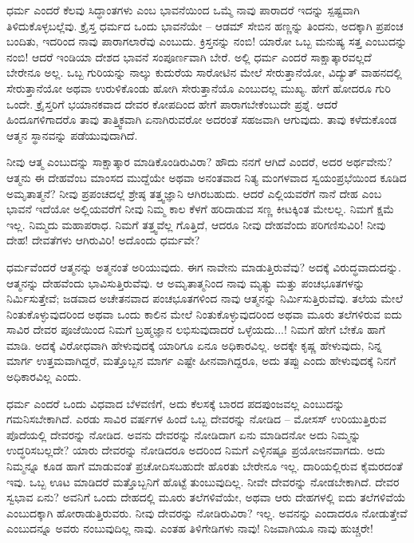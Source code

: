 ಧರ್ಮ ಎಂದರೆ ಕೆಲವು ಸಿದ್ಧಾಂತಗಳು ಎಂಬ ಭಾವನೆಯಿಂದ ಒಮ್ಮೆ ನಾವು ಪಾರಾದರೆ ಇದನ್ನು ಸ್ಪಷ್ಟವಾಗಿ ತಿಳಿದುಕೊಳ್ಳಬಲ್ಲೆವು. ಕ್ರೈಸ್ತ ಧರ್ಮದ ಒಂದು ಭಾವನೆಯೇ – ಆಡಮ್​ ಸೇಬಿನ ಹಣ್ಣನ್ನು ತಿಂದನು, ಅದಕ್ಕಾಗಿ ಪ್ರಪಂಚ ಬಂದಿತು, ಇದರಿಂದ ನಾವು ಪಾರಾಗಲಾರೆವು ಎಂಬುದು. ಕ್ರಿಸ್ತನನ್ನು ನಂಬಿ! ಯಾರೋ ಒಬ್ಬ ಮನುಷ್ಯ ಸತ್ತ ಎಂಬುದನ್ನು ನಂಬಿ! ಆದರೆ ಇಂಡಿಯಾ ದೇಶದ ಭಾವನೆ ಸಂಪೂರ್ಣವಾಗಿ ಬೇರೆ. ಅಲ್ಲಿ ಧರ್ಮ ಎಂದರೆ ಸಾಕ್ಷಾತ್ಕಾರವಲ್ಲದೆ ಬೇರೇನೂ ಅಲ್ಲ. ಒಬ್ಬ ಗುರಿಯನ್ನು ನಾಲ್ಕು ಕುದುರೆಯ ಸಾರೋಟಿನ ಮೇಲೆ ಸೇರುತ್ತಾನೆಯೋ, ವಿದ್ಯುತ್​ ವಾಹನದಲ್ಲಿ ಸೇರುತ್ತಾನೆಯೋ ಅಥವಾ ಉರುಳಿಕೊಂಡು ಹೋಗಿ ಸೇರುತ್ತಾನೆಯೊ ಎಂಬುದಲ್ಲ ಮುಖ್ಯ. ಹೇಗೆ ಹೋದರೂ ಗುರಿ ಒಂದೇ. ಕ್ರೈಸ್ತರಿಗೆ ಭಯಾನಕವಾದ ದೇವರ ಕೋಪದಿಂದ ಹೇಗೆ ಪಾರಾಗಬೇಕೆಂಬುದೇ ಪ್ರಶ್ನೆ. ಆದರೆ ಹಿಂದೂಗಳಿಗಾದರೊ ತಾವು ತಾತ್ತ್ವಿಕವಾಗಿ ಏನಾಗಿರುವರೋ ಅದರಂತೆ ಸಹಜವಾಗಿ ಆಗುವುದು. ತಾವು ಕಳೆದುಕೊಂಡ ಆತ್ಮನ ಸ್ಥಾನವನ್ನು ಪಡೆಯುವುದಾಗಿದೆ.

ನೀವು ಆತ್ಮ ಎಂಬುದನ್ನು ಸಾಕ್ಷಾತ್ಕಾರ ಮಾಡಿಕೊಂಡಿರುವಿರಾ? ಹೌದು ನನಗೆ ಆಗಿದೆ ಎಂದರೆ, ಅದರ ಅರ್ಥವೇನು? ಆತ್ಮನು ಈ ದೇಹವೆಂಬ ಮಾಂಸದ ಮುದ್ದೆಯೇ ಅಥವಾ ಅನಂತವಾದ ನಿತ್ಯ ಮಂಗಳವಾದ ಸ್ವಯಂಪ್ರಭೆಯಿಂದ ಕೂಡಿದ ಅಮೃತಾತ್ಮನೆ? ನೀವು ಪ್ರಪಂಚದಲ್ಲೆ ಶ್ರೇಷ್ಠ ತತ್ತ್ವಜ್ಞಾನಿ ಆಗಿರಬಹುದು. ಆದರೆ ಎಲ್ಲಿಯವರೆಗೆ ನಾನೆ ದೇಹ ಎಂಬ ಭಾವನೆ ಇದೆಯೋ ಅಲ್ಲಿಯವರೆಗೆ ನೀವು ನಿಮ್ಮ ಕಾಲ ಕೆಳಗೆ ಹರಿದಾಡುವ ಸಣ್ಣ ಕೀಟಕ್ಕಿಂತ ಮೇಲಲ್ಲ. ನಿಮಗೆ ಕ್ಷಮೆ ಇಲ್ಲ. ನಿಮ್ಮದು ಮಹಾಪರಾಧ. ನಿಮಗೆ ತತ್ತ್ವವೆಲ್ಲ ಗೊತ್ತಿದೆ, ಆದರೂ ನೀವು ದೇಹವೆಂದು ಪರಿಗಣಿಸುವಿರಿ! ನೀವು ದೇಹ! ದೇವತೆಗಳು ಆಗಿರುವಿರಿ! ಅದೊಂದು ಧರ್ಮವೇ?

ಧರ್ಮವೆಂದರೆ ಆತ್ಮನನ್ನು ಅತ್ಮನಂತೆ ಅರಿಯುವುದು. ಈಗ ನಾವೇನು ಮಾಡುತ್ತಿರುವೆವು? ಅದಕ್ಕೆ ವಿರುದ್ಧವಾದುದನ್ನು. ಆತ್ಮನನ್ನು ದೇಹವೆಂದು ಭಾವಿಸುತ್ತಿರುವೆವು. ಆ ಅಮೃತಾತ್ಮನಿಂದ ನಾವು ಮೃತ್ಯು ಮತ್ತು ಪಂಚಭೂತಗಳನ್ನು ನಿರ್ಮಿಸುತ್ತೇವೆ; ಜಡವಾದ ಅಚೇತನವಾದ ಪಂಚಭೂತಗಳಿಂದ ನಾವು ಆತ್ಮನನ್ನು ನಿರ್ಮಿಸುತ್ತಿರುವೆವು. ತಲೆಯ ಮೇಲೆ ನಿಂತುಕೊಳ್ಳುವುದರಿಂದ ಅಥವಾ ಒಂದು ಕಾಲಿನ ಮೇಲೆ ನಿಂತುಕೊಳ್ಳುವುದರಿಂದ ಅಥವಾ ಮೂರು ತಲೆಗಳಿರುವ ಐದು ಸಾವಿರ ದೇವರ ಪೂಜೆಯಿಂದ ನಿಮಗೆ ಬ್ರಹ್ಮಜ್ಞಾನ ಲಭಿಸುವುದಾದರೆ ಒಳ್ಳೆಯದು...! ನಿಮಗೆ ಹೇಗೆ ಬೇಕೊ ಹಾಗೆ ಮಾಡಿ. ಅದಕ್ಕೆ ವಿರೋಧವಾಗಿ ಹೇಳುವುದಕ್ಕೆ ಯಾರಿಗೂ ಏನೂ ಅಧಿಕಾರವಿಲ್ಲ. ಅದಕ್ಕೇ ಕೃಷ್ಣ ಹೇಳುವುದು, ನಿನ್ನ ಮಾರ್ಗ ಉತ್ತಮವಾಗಿದ್ದರೆ, ಮತ್ತೊಬ್ಬನ ಮಾರ್ಗ ಎಷ್ಟೇ ಹೀನವಾಗಿದ್ದರೂ, ಅದು ತಪ್ಪು ಎಂದು ಹೇಳುವುದಕ್ಕೆ ನಿನಗೆ ಅಧಿಕಾರವಿಲ್ಲ ಎಂದು.

ಧರ್ಮ ಎಂದರೆ ಒಂದು ವಿಧವಾದ ಬೆಳವಣಿಗೆ, ಅದು ಕೆಲಸಕ್ಕೆ ಬಾರದ ಪದಪುಂಜವಲ್ಲ ಎಂಬುದನ್ನು ಗಮನಿಸಬೇಕಾಗಿದೆ. ಎರಡು ಸಾವಿರ ವರ್ಷಗಳ ಹಿಂದೆ ಒಬ್ಬ ದೇವರನ್ನು ನೋಡಿದ – ಮೋಸಸ್​ ಉರಿಯುತ್ತಿರುವ ಪೊದೆಯಲ್ಲಿ ದೇವರನ್ನು ನೋಡಿದ. ಅವನು ದೇವರನ್ನು ನೋಡಿದಾಗ ಏನು ಮಾಡಿದನೋ ಅದು ನಿಮ್ಮನ್ನು ಉದ್ಧರಿಸಬಲ್ಲದೇ? ಯಾರು ದೇವರನ್ನು ನೋಡಿದರೂ ಅದರಿಂದ ನಿಮಗೆ ಎಳ್ಳಿನಷ್ಟೂ ಪ್ರಯೋಜನವಾಗದು. ಅದು ನಿಮ್ಮನ್ನೂ ಕೂಡ ಹಾಗೆ ಮಾಡುವಂತೆ ಪ್ರಚೋದಿಸಬಹುದೇ ಹೊರತು ಬೇರೇನೂ ಇಲ್ಲ. ದಾರಿಯಲ್ಲಿರುವ ಕೈಮರದಂತೆ ಇವು. ಒಬ್ಬ ಊಟ ಮಾಡಿದರೆ ಮತ್ತೊಬ್ಬನಿಗೆ ಹೊಟ್ಟೆ ತುಂಬುವುದಿಲ್ಲ. ನೀವೇ ದೇವರನ್ನು ನೋಡಬೇಕಾಗಿದೆ. ದೇವರ ಸ್ವಭಾವ ಏನು? ಅವನಿಗೆ ಒಂದು ದೇಹದಲ್ಲಿ ಮೂರು ತಲೆಗಳಿವೆಯೇ, ಅಥವಾ ಆರು ದೇಹಗಳಲ್ಲಿ ಐದು ತಲೆಗಳಿವೆಯೆ ಎಂಬುದಕ್ಕಾಗಿ ಹೋರಾಡುತ್ತಿರುವರು. ನೀವು ದೇವರನ್ನು ನೋಡಿರುವಿರಾ? ಇಲ್ಲ. ಅವನನ್ನು ಎಂದಾದರೂ ನೋಡುತ್ತೇವೆ ಎಂಬುದನ್ನೂ ಅವರು ನಂಬುವುದಿಲ್ಲ ನಾವು. ಎಂತಹ ತಿಳಿಗೇಡಿಗಳು ನಾವು! ನಿಜವಾಗಿಯೂ ನಾವು ಹುಚ್ಚರೇ!

